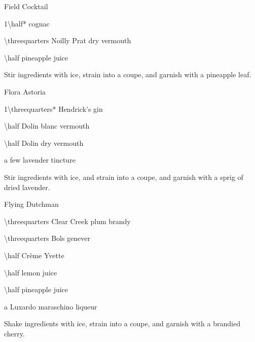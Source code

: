 \begin{Cocktail}[\PDT]{Field Cocktail}
  \begin{Ingredients}
  \item \SI{1\half*}{\oz} cognac
  \item \SI{\threequarters}{\oz} Noilly Prat dry vermouth
  \item \SI{\half}{\oz} pineapple juice
  \end{Ingredients}
  
  \begin{Instructions}
	Stir ingredients with ice, strain into a coupe, and garnish with a pineapple leaf.
  \end{Instructions}
\end{Cocktail}

\begin{Cocktail}[\PDT]{Flora Astoria}
  \begin{Ingredients}
  \item \SI{1\threequarters*}{\oz} Hendrick's gin
  \item \SI{\half}{\oz} Dolin blanc vermouth
  \item \SI{\half}{\oz} Dolin dry vermouth
  \item a few \si{\drops} lavender tincture
  \end{Ingredients}
  
  \begin{Instructions}
	Stir ingredients with ice, and strain into a coupe, and garnish with a sprig of dried lavender.
  \end{Instructions}
\end{Cocktail}

\begin{Cocktail}[\PDT]{Flying Dutchman}
  \begin{Ingredients}
  \item \SI{\threequarters}{\oz} Clear Creek plum brandy
  \item \SI{\threequarters}{\oz} Bols genever
  \item \SI{\half}{\oz} Cr\`eme Yvette
  \item \SI{\half}{\oz} lemon juice
  \item \SI{\half}{\oz} pineapple juice
  \item a \si{\dash} Luxardo maraschino liqueur
  \end{Ingredients}
  
  \begin{Instructions}
	Shake ingredients with ice, strain into a coupe, and garnish with a brandied cherry.
  \end{Instructions}
\end{Cocktail}

